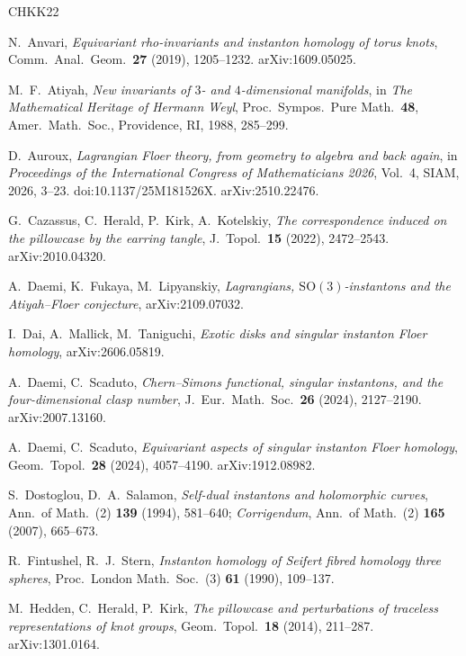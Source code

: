 \documentclass[11pt,reqno]{amsart}
\theoremstyle{plain}
\theoremstyle{definition}
\newcommand{\SO}{\mathrm{SO}(3)}
\begin{document}
\begin{thebibliography}{CHKK22}

 N.~Anvari, \emph{Equivariant rho-invariants and instanton homology of torus knots},
Comm.\ Anal.\ Geom.\ \textbf{27} (2019), 1205--1232. arXiv:1609.05025.

 M.~F.~Atiyah, \emph{New invariants of $3$- and $4$-dimensional manifolds}, in
\emph{The Mathematical Heritage of Hermann Weyl}, Proc.\ Sympos.\ Pure Math.\ \textbf{48}, Amer.\ Math.\
Soc., Providence, RI, 1988, 285--299.

 D.~Auroux, \emph{Lagrangian Floer theory, from geometry to algebra and back
again}, in \emph{Proceedings of the International Congress of Mathematicians 2026}, Vol.~4, SIAM, 2026,
3--23. doi:10.1137/25M181526X. arXiv:2510.22476.

 G.~Cazassus, C.~Herald, P.~Kirk, A.~Kotelskiy, \emph{The correspondence induced on the
pillowcase by the earring tangle}, J.\ Topol.\ \textbf{15} (2022), 2472--2543. arXiv:2010.04320.

 A.~Daemi, K.~Fukaya, M.~Lipyanskiy, \emph{Lagrangians, $\SO$-instantons and the
Atiyah--Floer conjecture}, arXiv:2109.07032.

 I.~Dai, A.~Mallick, M.~Taniguchi, \emph{Exotic disks and singular instanton Floer
homology}, arXiv:2606.05819.

 A.~Daemi, C.~Scaduto, \emph{Chern--Simons functional, singular instantons, and the
four-dimensional clasp number}, J.\ Eur.\ Math.\ Soc.\ \textbf{26} (2024), 2127--2190. arXiv:2007.13160.

 A.~Daemi, C.~Scaduto, \emph{Equivariant aspects of singular instanton Floer
homology}, Geom.\ Topol.\ \textbf{28} (2024), 4057--4190. arXiv:1912.08982.

 S.~Dostoglou, D.~A.~Salamon, \emph{Self-dual instantons and holomorphic curves}, Ann.\ of
Math.\ (2) \textbf{139} (1994), 581--640; \emph{Corrigendum}, Ann.\ of Math.\ (2) \textbf{165} (2007),
665--673.

 R.~Fintushel, R.~J.~Stern, \emph{Instanton homology of Seifert fibred homology three
spheres}, Proc.\ London Math.\ Soc.\ (3) \textbf{61} (1990), 109--137.

 M.~Hedden, C.~Herald, P.~Kirk, \emph{The pillowcase and perturbations of traceless
representations of knot groups}, Geom.\ Topol.\ \textbf{18} (2014), 211--287. arXiv:1301.0164.


\end{thebibliography}
\end{document}
